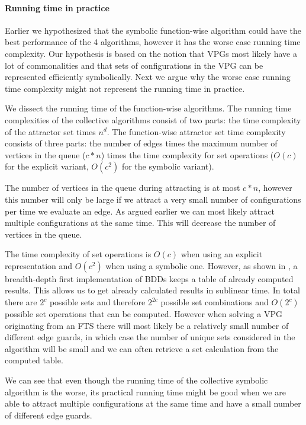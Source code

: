 \paragraph{Running time in practice}
Earlier we hypothesized that the symbolic function-wise algorithm could have the best performance of the 4 algorithms, however it has the worse case running time complexity. Our hypothesis is based on the notion that VPGs most likely have a lot of commonalities and that sets of configurations in the VPG can be represented efficiently symbolically. Next we argue why the worse case running time complexity might not represent the running time in practice.

We dissect the running time of the function-wise algorithms. The running time complexities of the collective algorithms consist of two parts: the time complexity of the attractor set times $n^d$. The function-wise attractor set time complexity consists of three parts: the number of edges times the maximum number of vertices in the queue ($c*n$) times the time complexity for set operations ($O(c)$ for the explicit variant, $O(c^2)$ for the symbolic variant).

The number of vertices in the queue during attracting is at most $c*n$, however this number will only be large if we attract a very small number of configurations per time we evaluate an edge. As argued earlier we can most likely attract multiple configurations at the same time. This will decrease the number of vertices in the queue.

The time complexity of set operations is $O(c)$ when using an explicit representation and $O(c^2)$ when using a symbolic one. However, as shown in \cite{BDD_running_time}, a breadth-depth first implementation of BDDs keeps a table of already computed results. This allows us to get already calculated results in sublinear time. In total there are $2^c$ possible sets and therefore $2^{2c}$ possible set combinations and $O(2^c)$ possible set operations that can be computed. However when solving a VPG originating from an FTS there will most likely be a relatively small number of different edge guards, in which case the number of unique sets considered in the algorithm will be small and we can often retrieve a set calculation from the computed table.

We can see that even though the running time of the collective symbolic algorithm is the worse, its practical running time might be good when we are able to attract multiple configurations at the same time and have a small number of different edge guards.